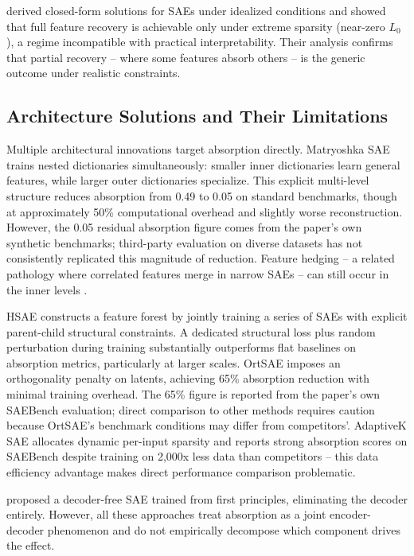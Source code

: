 \documentclass{article}
\begin{document}
\citet{cui2025} derived closed-form solutions for SAEs under idealized conditions and showed that full feature recovery is achievable only under extreme sparsity (near-zero $L_0$), a regime incompatible with practical interpretability. Their analysis confirms that partial recovery -- where some features absorb others -- is the generic outcome under realistic constraints.

\subsection{Architecture Solutions and Their Limitations}

Multiple architectural innovations target absorption directly. Matryoshka SAE \citep{bussmann2025} trains nested dictionaries simultaneously: smaller inner dictionaries learn general features, while larger outer dictionaries specialize. This explicit multi-level structure reduces absorption from 0.49 to 0.05 on standard benchmarks, though at approximately 50\% computational overhead and slightly worse reconstruction. However, the 0.05 residual absorption figure comes from the paper's own synthetic benchmarks; third-party evaluation on diverse datasets has not consistently replicated this magnitude of reduction. Feature hedging -- a related pathology where correlated features merge in narrow SAEs -- can still occur in the inner levels \citep{chanin2024}.

HSAE \citep{luo2026} constructs a feature forest by jointly training a series of SAEs with explicit parent-child structural constraints. A dedicated structural loss plus random perturbation during training substantially outperforms flat baselines on absorption metrics, particularly at larger scales. OrtSAE \citep{korznikov2025} imposes an orthogonality penalty on latents, achieving 65\% absorption reduction with minimal training overhead. The 65\% figure is reported from the paper's own SAEBench evaluation; direct comparison to other methods requires caution because OrtSAE's benchmark conditions may differ from competitors'. AdaptiveK SAE \citep{till2025} allocates dynamic per-input sparsity and reports strong absorption scores on SAEBench despite training on 2,000x less data than competitors -- this data efficiency advantage makes direct performance comparison problematic.

\citet{oursland2026} proposed a decoder-free SAE trained from first principles, eliminating the decoder entirely. However, all these approaches treat absorption as a joint encoder-decoder phenomenon and do not empirically decompose which component drives the effect.
\end{document}

